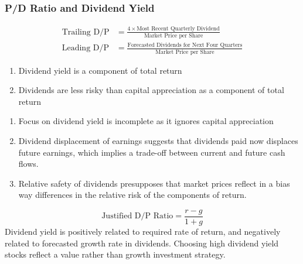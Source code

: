 \subsubsection{P/D Ratio and Dividend Yield}

\begin{definition} 
\begin{align}
\text{Trailing D/P} &= \frac{4 \times \text{Most Recent Quarterly Dividend}}{\text{Market Price per Share}} \nonumber \\
\text{Leading D/P} &= \frac{\text{Forecasted Dividends for Next Four Quarters}}{\text{Market Price per Share}} \nonumber
\end{align}
\end{definition}

\begin{remark} 
\begin{enumerate}[label=\roman*.]
\setlength{\itemsep}{0pt}
\item Dividend yield is a component of total return
\item Dividends are less risky than capital appreciation as a component of total return
\end{enumerate}
\end{remark}

\begin{remark} 
\begin{enumerate}[label=\roman*.]
\setlength{\itemsep}{0pt}
\item Focus on dividend yield is incomplete as it ignores capital appreciation
\item Dividend displacement of earnings suggests that dividends paid now displaces future earnings, which implies a trade-off between current and future cash flows.
\item Relative safety of dividends presupposes that market prices reflect in a bias way differences in the relative risk of the components of return.
\end{enumerate}
\end{remark}

\begin{definition} 
\begin{equation}
\text{Justified D/P Ratio} = \frac{r-g}{1+g} \nonumber
\end{equation}
Dividend yield is positively related to required rate of return, and negatively related to forecasted growth rate in dividends. Choosing high dividend yield stocks reflect a value rather than growth investment strategy.
\end{definition}

